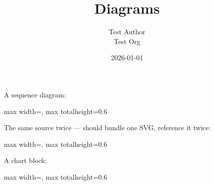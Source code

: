 \documentclass[11pt,a4paper]{article}
\title{Diagrams}
\author{Test Author \\ Test Org}
\date{2026-01-01}
\theoremstyle{definition}
\begin{document}
\maketitle

A sequence diagram:


\begin{center}
\begin{adjustbox}{max width=\textwidth, max totalheight=0.6\textheight}

\end{adjustbox}
\end{center}


The same source twice — should bundle one SVG, reference it twice:


\begin{center}
\begin{adjustbox}{max width=\textwidth, max totalheight=0.6\textheight}

\end{adjustbox}
\end{center}


A chart block:


\begin{center}
\begin{adjustbox}{max width=\textwidth, max totalheight=0.6\textheight}

\end{adjustbox}
\end{center}
\end{document}
